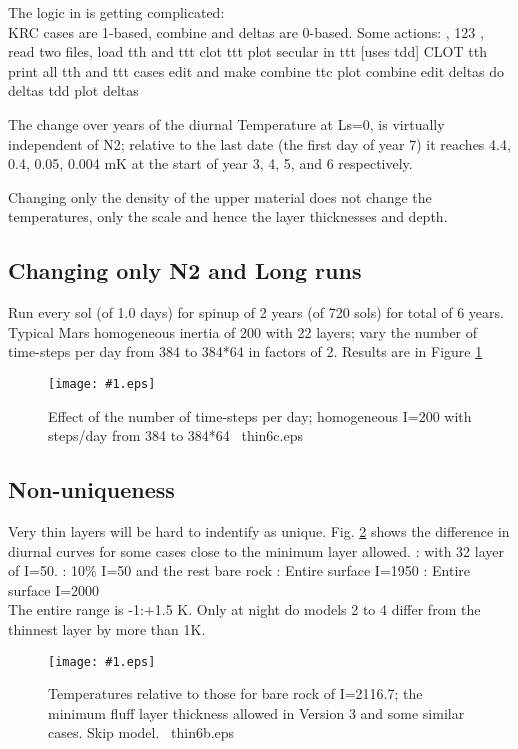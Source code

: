 \documentclass{article}  %
\newcommand{\igc}[1]{\texttt{[image: \#1.eps]}}  %
\begin{document}
The logic in  is getting complicated:
\\ KRC cases are 1-based, combine and deltas are 0-based. Some actions:
, 123 , read two files, load tth and ttt
 clot ttt
 plot secular in ttt [uses tdd]
 CLOT tth
 print all tth and ttt cases
 edit  and make combine ttc
  plot combine
  edit deltas
  do deltas tdd
  plot deltas

The change over years of the diurnal Temperature at Ls=0, is virtually
independent of N2; relative to the last date (the first day of year 7) it
reaches 4.4, 0.4, 0.05, 0.004 mK at the start of year 3, 4, 5, and 6
respectively.

Changing only the density of the upper material does not change the
temperatures, only the scale and hence the layer thicknesses and depth.

\clearpage
\subsection{Changing only N2 and Long runs} %
Run every sol (of 1.0 days) for spinup of 2 years (of 720 sols) for total of 6
years. Typical Mars homogeneous inertia of 200 with 22 layers; vary the number
of time-steps per day from 384 to 384*64 in factors of 2. Results are in Figure
\ref{thin6c}

\begin{figure}[!ht] \igc{img/thin6c}
\caption[N2 only]{Effect of the number of time-steps per day; homogeneous I=200
  with steps/day from 384 to 384*64 \ thin6c.eps \label{thin6c} } \end{figure}

\clearpage
\subsection{Non-uniqueness}

Very thin layers will be hard to indentify as unique. Fig. \ref{thin6b} shows 
the difference in diurnal curves for some cases close to the minimum layer allowed.
: with 32 \um layer of I=50.
: 10\% I=50 and the rest bare rock
: Entire surface I=1950
: Entire surface I=2000
\\ The entire range is -1:+1.5 K. Only at night do models 2 to 4 differ from the thinnest layer by more than 1K.

\begin{figure}[!ht] \igc{img/thin6b}
\caption[Similar to thinnest]{Temperatures relative to those for bare rock of I=2116.7; the minimum fluff layer thickness allowed in Version 3 and some similar cases.  Skip model.  \ thin6b.eps \label{thin6b} } \end{figure}
\end{document}
